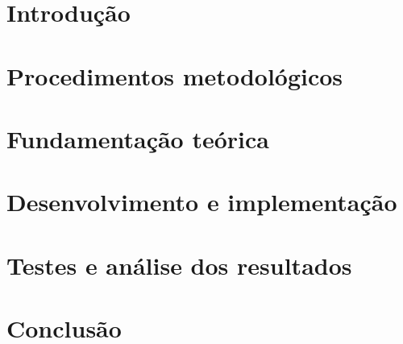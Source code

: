 \documentclass[
	11pt,				%
	openright,			%
	oneside,			%
	a4paper,			%
	english,			%
	french,				%
	spanish,			%
	brazil,				%
	]{abntex2}
\begin{document}
\tableofcontents*
\cleardoublepage



\textual

\chapter[Introdução]{Introdução}


\chapter{Procedimentos metodológicos}


\chapter{Fundamentação teórica}

%
\chapter{Desenvolvimento e implementação}


\chapter{Testes e análise dos resultados}




% 

\chapter[Conclusão]{Conclusão}



\postextual



\end{document}
